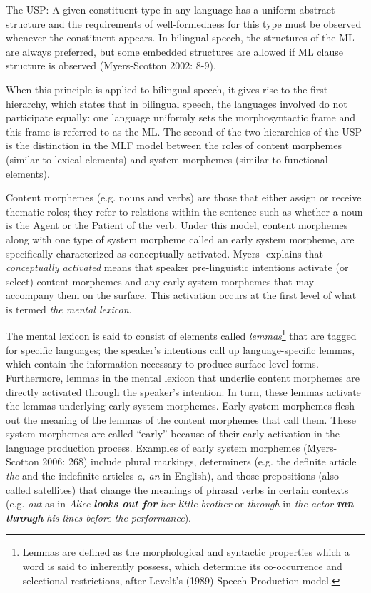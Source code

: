 \documentclass[output=paper]{langsci/langscibook}
\begin{document}
The USP: A given constituent type in any language has a uniform abstract structure and the requirements of well-formedness for this type must be observed whenever the constituent appears. In bilingual speech, the structures of the ML are always preferred, but some embedded structures are allowed if ML clause structure is observed (Myers-Scotton 2002: 8-9).

When this principle is applied to bilingual speech, it gives rise to the first hierarchy, which states that in bilingual speech, the languages involved do not participate equally: one language uniformly sets the morphosyntactic frame and this frame is referred to as the ML. The second of the two hierarchies of the USP is the distinction in the MLF model between the roles of content morphemes (similar to lexical elements) and system morphemes (similar to functional elements). 

Content morphemes (e.g. nouns and verbs) are those that either assign or receive thematic roles; they refer to relations within the sentence such as whether a noun is the Agent or the Patient of the verb. Under this model, content morphemes along with one type of system morpheme called an early system morpheme, are specifically characterized as conceptually activated. Myers-\citet{Scotton2002} explains that \textit{conceptually activated} means that speaker pre-linguistic intentions activate (or select) content morphemes and any early system morphemes that may accompany them on the surface. This activation occurs at the first level of what is termed \textit{the mental lexicon}.

The mental lexicon is said to consist of elements called \textit{lemmas}\footnote{ Lemmas are defined as the morphological and syntactic properties which a word is said to inherently possess, which determine its co-occurrence and selectional restrictions, after Levelt’s (1989) Speech Production model.} that are tagged for specific languages; the speaker’s intentions call up language-specific lemmas, which contain the information necessary to produce surface-level forms. Furthermore, lemmas in the mental lexicon that underlie content morphemes are directly activated through the speaker’s intention. In turn, these lemmas activate the lemmas underlying early system morphemes. Early system morphemes flesh out the meaning of the lemmas of the content morphemes that call them. These system morphemes are called “early” because of their early activation in the language production process. Examples of early system morphemes (Myers-Scotton 2006: 268) include plural markings, determiners (e.g. the definite article \textit{the }and the indefinite articles \textit{a, an }in English), and those prepositions (also called satellites) that change the meanings of phrasal verbs in certain contexts (e.g. \textit{out }as in \textit{Alice }\textbf{\textit{looks out for}}\textit{ her little brother }or \textit{through }in \textit{the actor }\textbf{\textit{ran through}}\textit{ his lines before the performance}).
\end{document}
